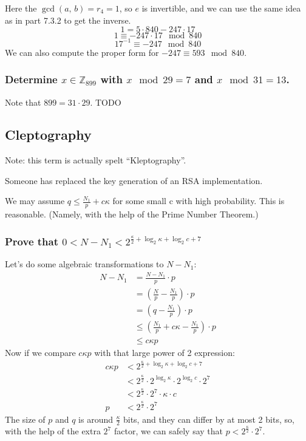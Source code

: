\documentclass{article}
\newcommand{\Z}{\mathbb{Z}}
\begin{document}
  Here the $\gcd(a,\, b) = r_4 = 1$, so $e$ is invertible, and we can use the same idea as in part 7.3.2 to get the inverse.
  \[ 1 = 5 \cdot 840 - 247 \cdot 17 \]
  \[ 1 \equiv -247 \cdot 17 \mod 840 \]
  \[ 17^{-1} \equiv -247 \mod 840 \]
  We can also compute the proper form for $-247 \equiv 593 \mod 840$.

  \subsubsection{Determine $x \in \Z_{899}$ with $x \mod 29 = 7$ and $x \mod 31 = 13$.}
  Note that $899 = 31 \cdot 29$.
  TODO

  \subsection{Cleptography}
  \begin{centerframebox}
    Note: this term is actually spelt ``Kleptography''.

    Someone has replaced the key generation of an RSA implementation.

    We may assume $q \leq \frac{N_1}{p} + c\kappa$ for some small c with high probability.
    This is reasonable. (Namely, with the help of the Prime Number Theorem.)
  \end{centerframebox}
  \subsubsection{Prove that $0 < N - N_1 < 2^{\frac{\kappa}{2} + \log_2\kappa + \log_2 c + 7}$}
  Let's do some algebraic transformations to $N - N_1$:
  \begin{align*}
    N - N_1 &= \frac{N - N_1}{p} \cdot p \\
    &= \left(\frac{N}{p} - \frac{N_1}{p}\right) \cdot p \\
    &= \left(q - \frac{N_1}{p}\right) \cdot p \\
    &\leq \left(\frac{N_1}{p} + c\kappa - \frac{N_1}{p}\right) \cdot p \\
    &\leq c\kappa p
  \end{align*}
  Now if we compare $c\kappa p$ with that large power of 2 expression:
  \begin{align*}
    c\kappa p &< 2^{\frac{\kappa}{2} + \log_2\kappa + \log_2 c + 7} \\
    &< 2^\frac{\kappa}{2} \cdot 2^{\log_2\kappa} \cdot 2^{\log_2 c} \cdot 2^7 \\
    &< 2^\frac{\kappa}{2} \cdot 2^7 \cdot \kappa \cdot c \\
    p&< 2^\frac{\kappa}{2} \cdot 2^7
  \end{align*}
  The size of $p$ and $q$ is around $\frac{\kappa}{2}$ bits, and they can differ by at most 2 bits,
  so, with the help of the extra $2^7$ factor, we can safely say that $p < 2^\frac{\kappa}{2} \cdot 2^7$.
\end{document}

